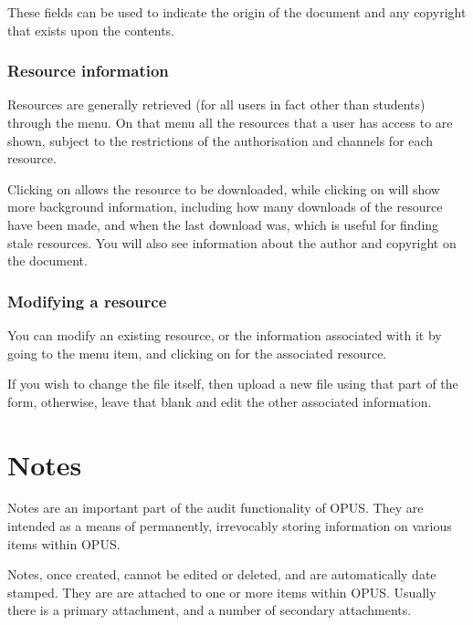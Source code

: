 \documentclass[12 pt]{book}
\begin{document}
These fields can be used to indicate the origin of the document and any
copyright that exists upon the contents.


\subsection{Resource information}

Resources are generally retrieved (for all users in fact other than students) 
through the 
menu. On that menu all the resources that a user has access to are shown,
subject to the restrictions of the authorisation and channels for each
resource.

Clicking on  allows the resource to be downloaded, while
clicking on  will show more background information,
including how many downloads of the resource have been made, and when
the last download was, which is useful for finding stale resources.
You will also see information about the author and copyright on the
document.

\subsection{Modifying a resource}

You can modify an existing resource, or the information associated with
it by going to the 
menu item, and clicking on  for the associated resource.

If you wish to change the file itself, then upload a new file using
that part of the form, otherwise, leave that blank and edit the other
associated information.

%
%
%

\chapter{Notes}
\label{Notes}

Notes are an important part of the audit functionality of OPUS. They are
intended as a means of permanently, irrevocably storing information on various
items within OPUS.

Notes, once created, cannot be edited or deleted, and are automatically date
stamped. They are are attached to one or more items within OPUS. Usually there
is a primary attachment, and a number of secondary attachments.
\end{document}
